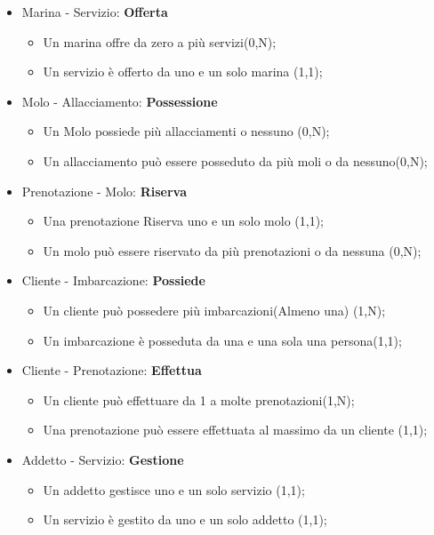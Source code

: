 \begin{itemize}
    
    \item Marina - Servizio: \textbf{Offerta}
    \begin{itemize}
        \item Un marina offre da zero a più servizi(0,N);
        \item Un servizio è offerto da uno e un solo marina (1,1);
    \end{itemize}
    
    \item Molo - Allacciamento: \textbf{Possessione}
    \begin{itemize}
        \item Un Molo possiede più allacciamenti o nessuno (0,N);
        \item Un allacciamento può essere posseduto da più moli o da nessuno(0,N);
    \end{itemize}
    
    \item Prenotazione - Molo: \textbf{Riserva}
    \begin{itemize}
        \item Una prenotazione Riserva uno e un solo molo (1,1);
        \item Un molo può essere riservato da più prenotazioni o da nessuna (0,N);
    \end{itemize}
    
    \item Cliente - Imbarcazione: \textbf{Possiede}
    \begin{itemize}
        \item Un cliente può possedere più imbarcazioni(Almeno una) (1,N);
        \item Un imbarcazione è posseduta da una e una sola una persona(1,1);
    \end{itemize}
    
    \item Cliente - Prenotazione: \textbf{Effettua}
    \begin{itemize}
        \item Un cliente può effettuare da 1 a molte prenotazioni(1,N);
        \item Una prenotazione può essere effettuata al massimo da un cliente (1,1);
    \end{itemize}
    
    \item Addetto - Servizio: \textbf{Gestione}
    \begin{itemize}
        \item Un addetto gestisce uno e un solo servizio (1,1);
        \item Un servizio è gestito da uno e un solo addetto (1,1);
    \end{itemize}
    

\end{itemize}

